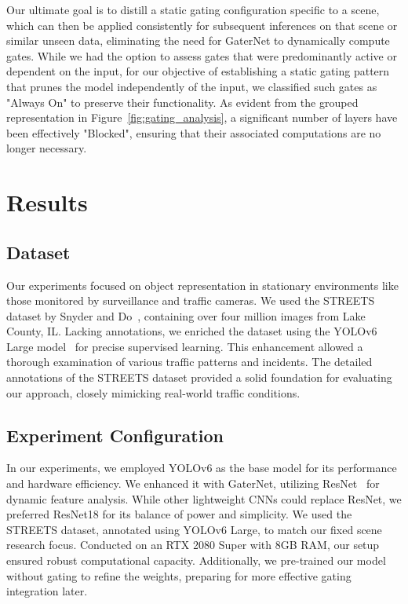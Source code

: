 \documentclass[runningheads]{llncs}
\begin{document}
Our ultimate goal is to distill a static gating configuration specific to a scene, which can then be applied consistently for subsequent inferences on that scene or similar unseen data, eliminating the need for GaterNet to dynamically compute gates. While we had the option to assess gates that were predominantly active or dependent on the input, for our objective of establishing a static gating pattern that prunes the model independently of the input, we classified such gates as "Always On" to preserve their functionality. As evident from the grouped representation in Figure~\ref{fig:gating_analysis}, a significant number of layers have been effectively "Blocked", ensuring that their associated computations are no longer necessary.

\section{Results}
\subsection{Dataset}
Our experiments focused on object representation in stationary environments like those monitored by surveillance and traffic cameras. We used the STREETS dataset by Snyder and Do~\cite{snyder2019streets}, containing over four million images from Lake County, IL. Lacking annotations, we enriched the dataset using the YOLOv6 Large model~\cite{li2023yolov6,li2022yolov6} for precise supervised learning. This enhancement allowed a thorough examination of various traffic patterns and incidents. The detailed annotations of the STREETS dataset provided a solid foundation for evaluating our approach, closely mimicking real-world traffic conditions.

\subsection{Experiment Configuration}
In our experiments, we employed YOLOv6 as the base model for its performance and hardware efficiency. We enhanced it with GaterNet, utilizing ResNet~\cite{he2016deep} for dynamic feature analysis. While other lightweight CNNs could replace ResNet, we preferred ResNet18 for its balance of power and simplicity. We used the STREETS dataset, annotated using YOLOv6 Large, to match our fixed scene research focus. Conducted on an RTX 2080 Super with 8GB RAM, our setup ensured robust computational capacity. Additionally, we pre-trained our model without gating to refine the weights, preparing for more effective gating integration later.
\end{document}

